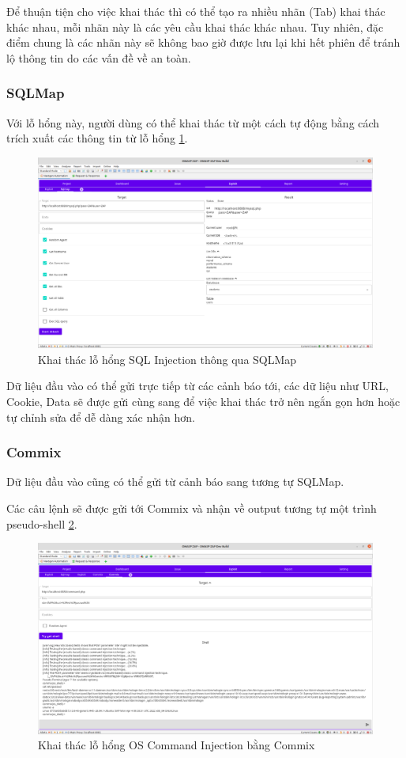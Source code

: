 \documentclass[./../main.tex]{subfiles}
\begin{document}
Để thuận tiện cho việc khai thác thì có thể tạo ra nhiều nhãn (Tab)
khai thác khác nhau, mỗi nhãn này là các yêu cầu khai thác khác nhau.
Tuy nhiên, đặc điểm chung là các nhãn này sẽ không bao giờ được lưu lại
khi hết phiên để tránh lộ thông tin do các vấn đề về an toàn.
\subsubsection{SQLMap}
Với lỗ hổng này, người dùng có thể khai thác từ một cách tự động
bằng cách trích xuất các thông tin từ lỗ hổng \ref{fig:sqlmap_explot}.

\begin{figure}[h!]
	\includegraphics[width=\linewidth]{./images/sqlmap_explot.png}
	\caption{Khai thác lỗ hổng SQL Injection thông qua SQLMap}
	\label{fig:sqlmap_explot}
\end{figure}
Dữ liệu đầu vào có thể gửi trực tiếp từ các cảnh báo tới, các dữ
liệu như URL, Cookie, Data sẽ được gửi cùng sang để việc khai thác
trở nên ngắn gọn hơn hoặc tự chỉnh sửa để dễ dàng xác nhận hơn.
\subsubsection{Commix}

Dữ liệu đầu vào cũng có thể gửi từ cảnh báo sang tương tự SQLMap.

Các câu lệnh sẽ được gửi tới Commix và nhận về output tương tự một
trình pseudo-shell \ref{fig:commix_exploit}.

\begin{figure}[h!]
	\includegraphics[width=\linewidth]{./images/commix_exploit.png}
	\caption{Khai thác lỗ hổng OS Command Injection bằng Commix	}
	\label{fig:commix_exploit}
\end{figure}
\end{document}
